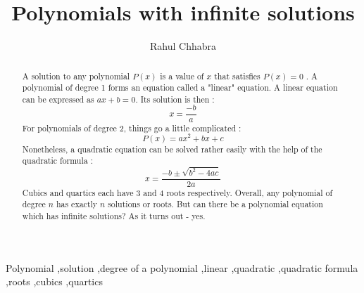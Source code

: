 \documentclass[preprint,12pt]{elsarticle}
\begin{document}
\begin{frontmatter}


\title{Polynomials with infinite solutions}




\author{Rahul Chhabra}

\address{St. Joseph's College, Prayagraj, Uttar Pradesh, India}

\begin{abstract}
A solution to any polynomial $P(x)$ is a value of $x$ that satisfies $P(x) = 0$ . A polynomial of degree 1 forms an equation called a "linear" equation. A linear equation can be expressed as $ax + b = 0$. Its solution is then : 
\[
    x = \frac{-b}{a}
\]
For polynomials of degree 2, things go a little complicated :
\[
    P(x) = ax^2 + bx + c
\]
Nonetheless, a quadratic equation can be solved rather easily with the help of the quadratic formula :
\[
    x = \frac{-b \pm \sqrt{b^2 - 4ac}}{2a} 
\]
Cubics and quartics each have 3 and 4 roots respectively.
Overall, any polynomial of degree $n$ has exactly $n$ solutions or roots. 
But can there be a polynomial equation which has infinite solutions?
As it turns out - yes.
\end{abstract}

\begin{keyword}
Polynomial \sep solution \sep degree of a polynomial \sep linear 
\sep quadratic \sep quadratic formula \sep roots \sep cubics \sep quartics


\end{keyword}

\end{frontmatter}
\end{document}
